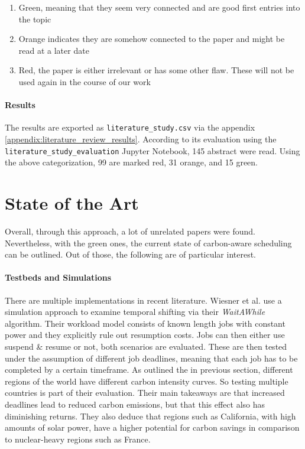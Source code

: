\begin{enumerate}
    \item Green, meaning that they seem very connected and are good first entries into the topic
    \item Orange indicates they are somehow connected to the paper and might be read at a later date
    \item Red, the paper is either irrelevant or has some other flaw. These will not be used again in the course of our work
\end{enumerate}

\paragraph{Results}

The results are exported as \verb|literature_study.csv| via the appendix \ref{appendix:literature_review_results}. 
According to its evaluation using the \verb|literature_study_evaluation| Jupyter Notebook, 145 abstract were read. 
Using the above categorization, 99 are marked red, 31 orange, and 15 green.

\section{State of the Art} \label{sec:state_of_the_art}

Overall, through this approach, a lot of unrelated papers were found.
Nevertheless, with the green ones, the current state of carbon-aware scheduling can be outlined.
Out of those, the following are of particular interest.

\paragraph{Testbeds and Simulations}
There are multiple implementations in recent literature. Wiesner et al. \cite{wiesner_lets_2021} use a simulation approach to examine temporal shifting via their \emph{WaitAWhile} algorithm. 
Their workload model consists of known length jobs with constant power and they explicitly rule out resumption costs. 
Jobs can then either use suspend \& resume or not, both scenarios are evaluated. 
These are then tested under the assumption of different job deadlines, meaning that each job has to be completed by a certain timeframe. 
As outlined the in previous section, different regions of the world have different carbon intensity curves. 
So testing multiple countries is part of their evaluation.
Their main takeaways are that increased deadlines lead to reduced carbon emissions, but that this effect also has diminishing returns. 
They also deduce that regions such as California, with high amounts of solar power, have a higher potential for carbon savings in comparison to nuclear-heavy regions such as France.

